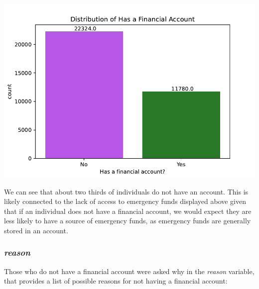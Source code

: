 \documentclass[water,article,submit,moreauthors,pdftex]{mdpi}
\begin{document}
\includegraphics{term_paper_files/figure-latex/unnamed-chunk-9-7.pdf}

We can see that about two thirds of individuals do not have an account.
This is likely connected to the lack of access to emergency funds
displayed above given that if an individual does not have a financial
account, we would expect they are less likely to have a source of
emergency funds, as emergency funds are generally stored in an account.

\hypertarget{reason}{%
\subsubsection{\texorpdfstring{\emph{reason}}{reason}}\label{reason}}

Those who do not have a financial account were asked why in the
\emph{reason} variable, that provides a list of possible reasons for not
having a financial account:
\end{document}
